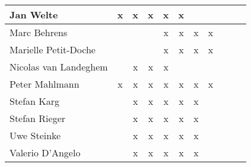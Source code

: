 \documentclass[a4paper, 11pt]{article}
\begin{document}
\begin{tabular}{|l|c|c|c|c||c|c|c||c|c|c|}
Jan Welte            & x & x & x & x & x &   &   \\\hline
Marc Behrens         &   &   &   & x & x & x & x \\\hline
Marielle Petit-Doche &   &   &   & x & x & x & x \\\hline
Nicolas van Landeghem &   & x & x & x &   &   &   \\\hline
Peter Mahlmann       & x & x & x & x & x & x & x \\\hline
Stefan Karg          &   & x & x & x & x & x &   \\\hline
Stefan Rieger        &   & x & x & x & x & x &   \\\hline
Uwe Steinke          &   & x & x & x & x & x &   \\\hline
Valerio D'Angelo     &   & x & x & x & x & x &   \\\hline
\end{tabular}

\end{document}
